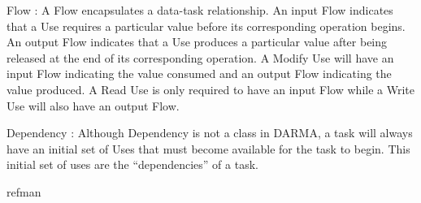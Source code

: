 \begin{compactdesc}
\item [Flow]: A Flow encapsulates a data-task relationship. 
An input Flow indicates that a Use requires a particular value before its corresponding operation begins.
An output Flow indicates that a Use produces a particular value after being released at the end of its corresponding operation.
A Modify Use will have an input Flow indicating the value consumed and an output Flow indicating the value produced.
A Read Use is only required to have an input Flow while a Write Use will also have an output Flow.
\item [Dependency]: Although Dependency is not a class in DARMA, a task will always have an initial set of Uses that must become
available for the task to begin.
This initial set of uses are the ``dependencies'' of a task.
\end{compactdesc} 

{refman}
